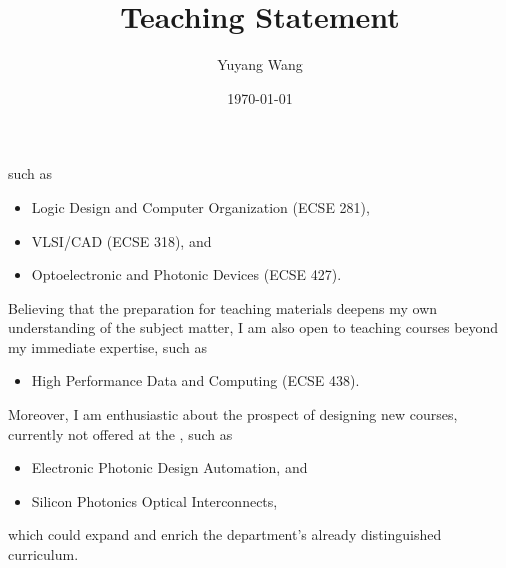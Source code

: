 



\title{Teaching Statement}

\def\courseOneName{Logic Design and Computer Organization}
\def\courseOneNumber{ECSE 281}
\def\courseTwoName{VLSI/CAD}
\def\courseTwoNumber{ECSE 318}
\def\courseThreeName{Optoelectronic and Photonic Devices}
\def\courseThreeNumber{ECSE 427}
\def\courseFourName{High Performance Data and Computing}
\def\courseFourNumber{ECSE 438}
\def\courseSixName{Electronic Photonic Design Automation}
\def\courseSevenName{Silicon Photonics Optical Interconnects}

\def\rsCustom{%
such as 
\begin{itemize}[nosep]
    \item \courseOneName{} (\courseOneNumber{}),
    \item \courseTwoName{} (\courseTwoNumber{}), and
    \item \courseThreeName{} (\courseThreeNumber{}).
\end{itemize}
Believing that the preparation for teaching materials deepens my own understanding of the subject matter, I am also open to teaching courses beyond my immediate expertise, such as
\begin{itemize}[nosep]
    \item \courseFourName{} (\courseFourNumber{}).
\end{itemize}
Moreover, I am enthusiastic about the prospect of designing new courses, currently not offered at the \appSchool{}, such as
\begin{itemize}[nosep]
    \item \courseSixName{}, and 
    \item \courseSevenName{},
\end{itemize}
which could expand and enrich the department's already distinguished curriculum.
}

\author{Yuyang Wang}
\date{\today}
\makeatletter
\fancyfoot[L]{\scshape \MakeLowercase{\@author}}
\fancyfoot[R]{{\scshape \MakeLowercase{\@title}}\quad{\LARGE\sfrac{\thepage}{\pageref*{LastPage}}}}
\makeatother



\maketitle%
\thispagestyle{fancy}


\rsCustom{}


\footnotesize


